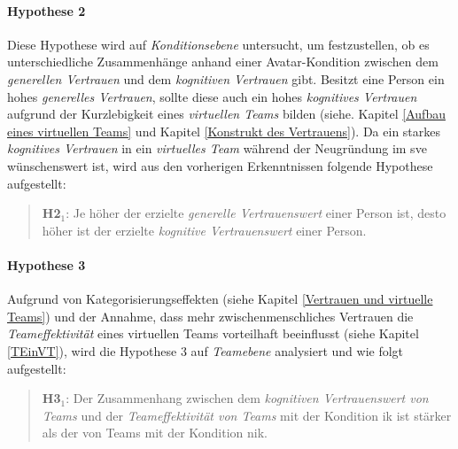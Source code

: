 \documentclass[a4paper,11pt]{article}%
\renewcommand{\\}{\vspace*{0.5\baselineskip} \newline}
\begin{document}
\paragraph{Hypothese 2}
Diese Hypothese wird auf \textit{Konditionsebene} untersucht, um festzustellen, ob es unterschiedliche Zusammenhänge anhand einer Avatar-Kondition zwischen dem \textit{generellen Vertrauen} und dem \textit{kognitiven Vertrauen} gibt. Besitzt eine Person ein hohes \textit{generelles Vertrauen}, sollte diese auch ein hohes \textit{kognitives Vertrauen} aufgrund der Kurzlebigkeit eines \textit{virtuellen Teams} bilden (siehe. Kapitel \ref{Aufbau eines virtuellen Teams} und Kapitel \ref{Konstrukt des Vertrauens}).
Da ein starkes \textit{kognitives Vertrauen} in ein \textit{virtuelles Team} während der Neugründung im \ac{sve} wünschenswert ist, wird aus den vorherigen Erkenntnissen folgende Hypothese aufgestellt:
\begin{quote}
\textbf{H2$_{1}$}: Je höher der erzielte \textit{generelle Vertrauenswert} einer Person ist, desto höher ist der erzielte \textit{kognitive Vertrauenswert} einer Person.
\end{quote}

\paragraph{Hypothese 3}
Aufgrund von Kategorisierungseffekten (siehe Kapitel \ref{Vertrauen und virtuelle Teams}) und der Annahme, dass mehr zwischenmenschliches Vertrauen die \textit{Teameffektivität} eines virtuellen Teams vorteilhaft beeinflusst (siehe Kapitel \ref{TEinVT}), wird die Hypothese 3 auf \textit{Teamebene} analysiert und wie folgt aufgestellt: 
\begin{quote}
\textbf{H3$_{1}$}: Der Zusammenhang zwischen dem \textit{kognitiven Vertrauenswert von Teams} und der \textit{Teameffektivität von Teams} mit der Kondition \ac{ik} ist stärker als der von Teams mit der Kondition \ac{nik}.
\end{quote}
\end{document}
